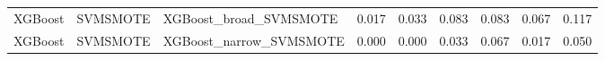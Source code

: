 \begin{tabular}{lllllllll}
                     XGBoost &            SVMSMOTE &                       XGBoost\_broad\_SVMSMOTE & 0.017 &                     0.033 &                 0.083 &                  0.083 &                                   0.067 &     0.117 \\
                     XGBoost &            SVMSMOTE &                      XGBoost\_narrow\_SVMSMOTE & 0.000 &                     0.000 &                 0.033 &                  0.067 &                                   0.017 &     0.050 \\
\bottomrule
\end{tabular}
